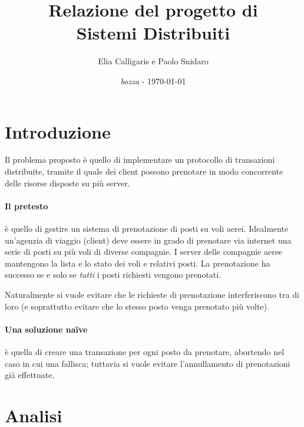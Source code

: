 \documentclass[a4paper]{article}
\begin{document}
\title{Relazione del progetto di \\Sistemi Distribuiti}
\author{Elia Calligaris e Paolo Snidaro}
\date{\textit{bozza} - \today}
\maketitle
\tableofcontents

\section{Introduzione}\label{sec:intro}

Il problema proposto è quello di implementare un protocollo di transazioni distribuite, tramite il quale dei client possono prenotare in modo concorrente delle risorse disposte su più server.

\paragraph{Il pretesto} è quello di gestire un sistema di prenotazione di posti su voli aerei. Idealmente un'agenzia di viaggio (client) deve essere in grado di prenotare via internet una serie di posti su più voli di diverse compagnie. I server delle compagnie aeree mantengono la lista e lo stato dei voli e relativi posti. La prenotazione ha successo se e solo se \textit{tutti} i posti richiesti vengono prenotati. 

Naturalmente si vuole evitare che le richieste di prenotazione interferiscono tra di loro (e soprattutto evitare che lo stesso posto venga prenotato più volte). %

\paragraph{Una soluzione na\"ive} è quella di creare una transazione per ogni posto da prenotare, abortendo nel caso in cui una fallisca; tuttavia si vuole evitare l'annullamento di prenotazioni già effettuate.


\section{Analisi}\label{sec:analisi}
\end{document}
